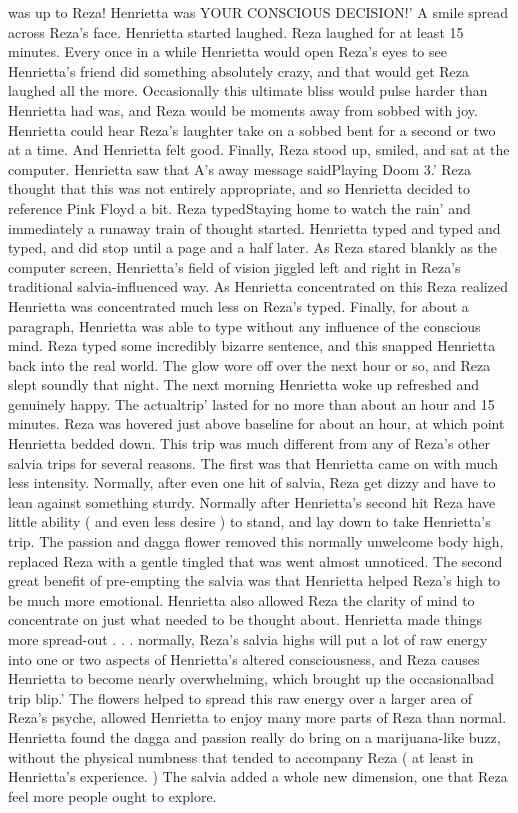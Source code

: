 \documentclass[12pt]{book}
\begin{document}
was up to Reza! Henrietta was YOUR CONSCIOUS DECISION!' A smile spread across Reza's face. Henrietta started laughed. Reza laughed for at least 15 minutes. Every once in a while Henrietta would open Reza's eyes to see Henrietta's friend did something absolutely crazy, and that would get Reza laughed all the more. Occasionally this ultimate bliss would pulse harder than Henrietta had was, and Reza would be moments away from sobbed with joy. Henrietta could hear Reza's laughter take on a sobbed bent for a second or two at a time. And Henrietta felt good. Finally, Reza stood up, smiled, and sat at the computer. Henrietta saw that A's away message saidPlaying Doom 3.' Reza thought that this was not entirely appropriate, and so Henrietta decided to reference Pink Floyd a bit. Reza typedStaying home to watch the rain' and immediately a runaway train of thought started. Henrietta typed and typed and typed, and did stop until a page and a half later. As Reza stared blankly as the computer screen, Henrietta's field of vision jiggled left and right in Reza's traditional salvia-influenced way. As Henrietta concentrated on this Reza realized Henrietta was concentrated much less on Reza's typed. Finally, for about a paragraph, Henrietta was able to type without any influence of the conscious mind. Reza typed some incredibly bizarre sentence, and this snapped Henrietta back into the real world. The glow wore off over the next hour or so, and Reza slept soundly that night. The next morning Henrietta woke up refreshed and genuinely happy. The actualtrip' lasted for no more than about an hour and 15 minutes. Reza was hovered just above baseline for about an hour, at which point Henrietta bedded down. This trip was much different from any of Reza's other salvia trips for several reasons. The first was that Henrietta came on with much less intensity. Normally, after even one hit of salvia, Reza get dizzy and have to lean against something sturdy. Normally after Henrietta's second hit Reza have little ability ( and even less desire ) to stand, and lay down to take Henrietta's trip. The passion and dagga flower removed this normally unwelcome body high, replaced Reza with a gentle tingled that was went almost unnoticed. The second great benefit of pre-empting the salvia was that Henrietta helped Reza's high to be much more emotional. Henrietta also allowed Reza the clarity of mind to concentrate on just what needed to be thought about. Henrietta made things more spread-out . . .  normally, Reza's salvia highs will put a lot of raw energy into one or two aspects of Henrietta's altered consciousness, and Reza causes Henrietta to become nearly overwhelming, which brought up the occasionalbad trip blip.' The flowers helped to spread this raw energy over a larger area of Reza's psyche, allowed Henrietta to enjoy many more parts of Reza than normal. Henrietta found the dagga and passion really do bring on a marijuana-like buzz, without the physical numbness that tended to accompany Reza ( at least in Henrietta's experience. ) The salvia added a whole new dimension, one that Reza feel more people ought to explore.
\end{document}

